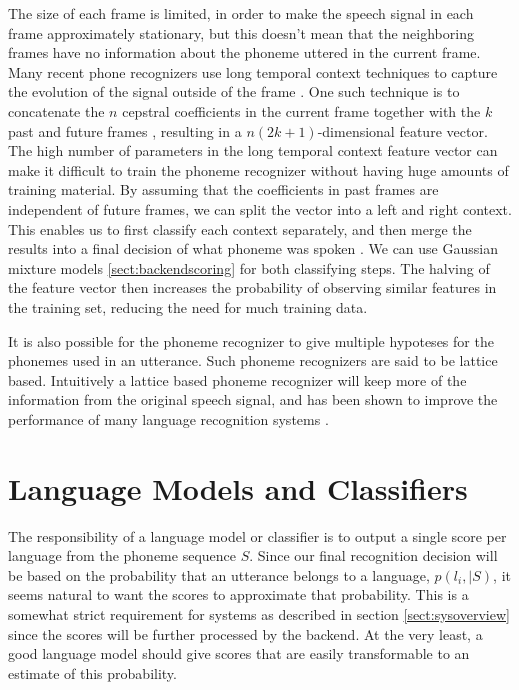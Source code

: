The size of each frame is limited, in order to make the speech signal in each frame approximately stationary, but this doesn't mean that the neighboring frames have no information about the phoneme uttered in the current frame. Many recent phone recognizers use long temporal context techniques to capture the evolution of the signal outside of the frame \cite[p. 8]{butphnrec}. One such technique is to concatenate the $n$ cepstral coefficients in the current frame together with the $k$ past and future frames \cite[9]{butphnrec}, resulting in a $n(2k+1)$-dimensional feature vector. The high number of parameters in the long temporal context feature vector can make it difficult to train the phoneme recognizer without having huge amounts of training material. By assuming that the coefficients in past frames are independent of future frames, we can split the vector into a left and right context. This enables us to first classify each context separately, and then merge the results into a final decision of what phoneme was spoken \cite[p. 36]{butphnrec}. We can use Gaussian mixture models \ref{sect:backendscoring} for both classifying steps. The halving of the feature vector then increases the probability of observing similar features in the training set, reducing the need for much training data.

It is also possible for the phoneme recognizer to give multiple hypoteses for the phonemes used in an utterance. Such phoneme recognizers are said to be lattice based. Intuitively a lattice based phoneme recognizer will keep more of the information from the original speech signal, and has been shown to improve the performance of many language recognition systems \cite[p. 818]{lidbok}.


\section{Language Models and Classifiers}
\label{sect:basiclangmodel}

The responsibility of a language model or classifier is to output a single score per language from the phoneme sequence $S$. Since our final recognition decision will be based on the probability that an utterance belongs to a language, $p(l_i, | S)$, it seems natural to want the scores to approximate that probability. This is a somewhat strict requirement for systems as described in section \ref{sect:sysoverview} since the scores will be further processed by the backend. At the very least, a good language model should give scores that are easily transformable to an estimate of this probability. 

